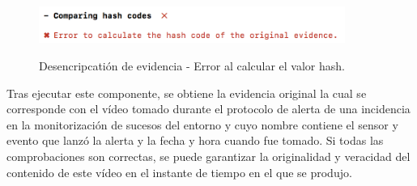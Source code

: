 \documentclass[12pt,a4paper, twoside]{report}
\begin{document}
		\begin{figure}[!ht]   
			\caption{Desencripcatión de evidencia - Error al calcular el valor hash.} 
			\begin{center} 					\includegraphics[width=10cm,height=1.2cm]{Images/userGuide/evidence/error_hash} \\
				\label{fig:userguide_evidence_error_hash} 
			\end{center}  
		\end{figure}
	
	Tras ejecutar este componente, se obtiene la evidencia original la cual se corresponde con el vídeo tomado durante el protocolo de alerta de una incidencia en la monitorización de sucesos del entorno y cuyo nombre contiene el sensor y evento que lanzó la alerta y la fecha y hora cuando fue tomado. Si todas las comprobaciones son correctas, se puede garantizar la originalidad y veracidad del contenido de este vídeo en el instante de tiempo en el que se produjo.
	
\end{document}
